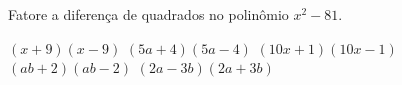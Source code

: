 Fatore a diferença de quadrados no polinômio $x^2-81$.

$(x+9)(x-9)$
$(5a+4)(5a-4)$
$(10x+1)(10x-1)$
$(ab+2)(ab-2)$
$(2a-3b)(2a+3b)$


